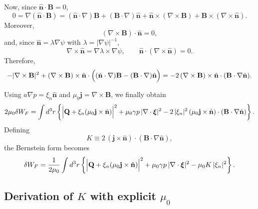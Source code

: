 \documentclass[10pt,a4paper]{article}
\numberwithin{equation}{section}
\begin{document}
Now, since \(\hat{\mathbf n}\cdot\mathbf B=0\),
\begin{equation}
0=\nabla(\hat{\mathbf n}\cdot\mathbf B)
=
(\hat{\mathbf n}\cdot\nabla)\mathbf B
+(\mathbf B\cdot\nabla)\hat{\mathbf n}
+\hat{\mathbf n}\times(\nabla\times\mathbf B)
+\mathbf B\times(\nabla\times\hat{\mathbf n}).
\end{equation}
Moreover,
\begin{equation}
(\nabla\times\mathbf B)\cdot\hat{\mathbf n}=0,
\end{equation}
and, since \(\hat{\mathbf n}=\lambda\nabla\psi\) with \(\lambda=|\nabla\psi|^{-1}\),
\begin{equation}
\nabla\times\hat{\mathbf n}
=
\nabla\lambda\times\nabla\psi,
\qquad
\hat{\mathbf n}\cdot(\nabla\times\hat{\mathbf n})=0.
\end{equation}
Therefore,
\begin{equation}
-|\nabla\times\mathbf B|^2
+(\nabla\times\mathbf B)\times\hat{\mathbf n}\cdot
\Bigl((\hat{\mathbf n}\cdot\nabla)\mathbf B-(\mathbf B\cdot\nabla)\hat{\mathbf n}\Bigr)
=
-2\,(\nabla\times\mathbf B)\times\hat{\mathbf n}\cdot(\mathbf B\cdot\nabla\hat{\mathbf n}).
\end{equation}

Using \(a\nabla p=\xi_n\hat{\mathbf n}\) and \(\mu_0\mathbf j=\nabla\times\mathbf B\), we finally obtain
\begin{equation}
2\mu_0 \delta W_F
=
\int d^3r\left\{
\Bigl|\mathbf Q+\xi_n(\mu_0\mathbf j\times\hat{\mathbf n})\Bigr|^2
+\mu_0\gamma p\,|\nabla\cdot\boldsymbol{\xi}|^2
-2\,|\xi_n|^2\,(\mu_0\mathbf j\times\hat{\mathbf n})\cdot(\mathbf B\cdot\nabla\hat{\mathbf n})
\right\}.
\end{equation}
Defining
\begin{equation}
K \equiv 2\,(\mathbf j\times\hat{\mathbf n})\cdot(\mathbf B\cdot\nabla\hat{\mathbf n}),
\end{equation}
the Bernstein form becomes
\begin{equation}
\delta W_F
=
\frac{1}{2\mu_0}\int d^3r\left\{
\Bigl|\mathbf Q+\xi_n(\mu_0\mathbf j\times\hat{\mathbf n})\Bigr|^2
+\mu_0\gamma p\,|\nabla\cdot\boldsymbol{\xi}|^2
-\mu_0 K\,|\xi_n|^2
\right\}.
\end{equation}

\subsection{Derivation of $K$ with explicit $\mu_0$}
\end{document}
